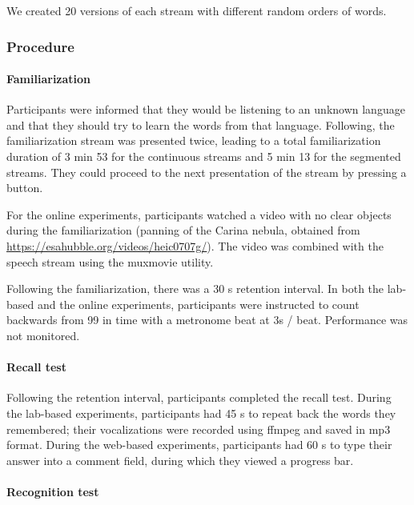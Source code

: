 \documentclass[
]{article}
\begin{document}
We created 20 versions of each stream with different random orders of
words.

\clearpage

\hypertarget{procedure-1}{%
\subsubsection{Procedure}\label{procedure-1}}

\hypertarget{familiarization}{%
\paragraph{Familiarization}\label{familiarization}}

Participants were informed that they would be listening to an unknown
language and that they should try to learn the words from that language.
Following, the familiarization stream was presented twice, leading to a
total familiarization duration of 3 min 53 for the continuous streams
and 5 min 13 for the segmented streams. They could proceed to the next
presentation of the stream by pressing a button.

For the online experiments, participants watched a video with no clear
objects during the familiarization (panning of the Carina nebula,
obtained from \url{https://esahubble.org/videos/heic0707g/}). The video
was combined with the speech stream using the muxmovie utility.

Following the familiarization, there was a 30 s retention interval. In
both the lab-based and the online experiments, participants were
instructed to count backwards from 99 in time with a metronome beat at
3s / beat. Performance was not monitored.

\hypertarget{recall-test}{%
\paragraph{Recall test}\label{recall-test}}

Following the retention interval, participants completed the recall
test. During the lab-based experiments, participants had 45 s to repeat
back the words they remembered; their vocalizations were recorded using
ffmpeg and saved in mp3 format. During the web-based experiments,
participants had 60 s to type their answer into a comment field, during
which they viewed a progress bar.

\hypertarget{recognition-test}{%
\paragraph{Recognition test}\label{recognition-test}}
\end{document}
